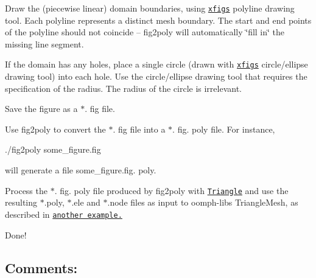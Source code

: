\begin{DoxyEnumerate}
\item Draw the (piecewise linear) domain boundaries, using \href{http://en.wikipedia.org/wiki/Xfig}{\tt xfig\textquotesingle{}s} polyline drawing tool. Each polyline represents a distinct mesh boundary. The start and end points of the polyline should not coincide -- {\ttfamily fig2poly} will automatically \char`\"{}fill in\char`\"{} the missing line segment. ~\newline
~\newline

\item If the domain has any holes, place a single circle (drawn with \href{http://en.wikipedia.org/wiki/Xfig}{\tt xfig\textquotesingle{}s} circle/ellipse drawing tool) into each hole. Use the circle/ellipse drawing tool that requires the specification of the radius. The radius of the circle is irrelevant. ~\newline
~\newline

\item Save the figure as a {\ttfamily $\ast$}. {\ttfamily fig} file. ~\newline
~\newline

\item Use {\ttfamily fig2poly} to convert the {\ttfamily $\ast$}. {\ttfamily fig} file into a {\ttfamily $\ast$}. {\ttfamily fig}. {\ttfamily poly} file. For instance, 
\begin{DoxyCode}
./fig2poly some\_figure.fig
\end{DoxyCode}
 will generate a file {\ttfamily some\+\_\+figure}.{\ttfamily fig}. {\ttfamily poly}. ~\newline
~\newline

\item Process the {\ttfamily $\ast$}. {\ttfamily fig}. {\ttfamily poly} file produced by {\ttfamily fig2poly} with \href{http://www.cs.cmu.edu/~quake/triangle.html}{\tt Triangle} and use the resulting {\ttfamily $\ast$}.poly, {\ttfamily $\ast$}.ele and {\ttfamily $\ast$}.node files as input to {\ttfamily oomph-\/lib\textquotesingle{}s} {\ttfamily Triangle\+Mesh}, as described in \href{../../mesh_from_triangle/html/index.html}{\tt another example.} ~\newline
~\newline

\item Done!
\end{DoxyEnumerate}\hypertarget{index_xfig_comments}{}\subsection{Comments\+:}\label{index_xfig_comments}

